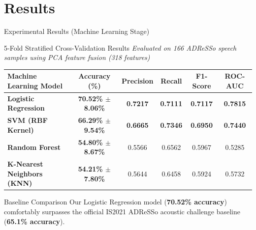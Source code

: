 \documentclass[aspectratio=169]{beamer}
\begin{document}
\section{Results}
\begin{frame}{Experimental Results (Machine Learning Stage)}
    \begin{block}{5-Fold Stratified Cross-Validation Results}
        \textit{Evaluated on 166 ADReSSo speech samples using PCA feature fusion (318 features)}
    \end{block}
    
    \begin{table}
    \centering
    \small
    \begin{tabular}{lccccc}
        \toprule
        \textbf{Machine Learning Model} & \textbf{Accuracy (\%)} & \textbf{Precision} & \textbf{Recall} & \textbf{F1-Score} & \textbf{ROC-AUC} \\
        \midrule
        \textbf{Logistic Regression} & \textbf{70.52\% $\pm$ 8.06\%} & \textbf{0.7217} & \textbf{0.7111} & \textbf{0.7117} & \textbf{0.7815} \\
        \textbf{SVM (RBF Kernel)} & \textbf{66.29\% $\pm$ 9.54\%} & \textbf{0.6665} & \textbf{0.7346} & \textbf{0.6950} & \textbf{0.7440} \\
        \textbf{Random Forest} & \textbf{54.80\% $\pm$ 8.67\%} & 0.5566 & 0.6562 & 0.5967 & 0.5285 \\
        \textbf{K-Nearest Neighbors (KNN)} & \textbf{54.21\% $\pm$ 7.80\%} & 0.5644 & 0.6458 & 0.5924 & 0.5732 \\
        \bottomrule
    \end{tabular}
    \end{table}
    
    \begin{block}{Baseline Comparison}
        Our Logistic Regression model (\textbf{70.52\% accuracy}) comfortably surpasses the official IS2021 ADReSSo acoustic challenge baseline (\textbf{65.1\% accuracy}).
    \end{block}
\end{frame}
\end{document}
